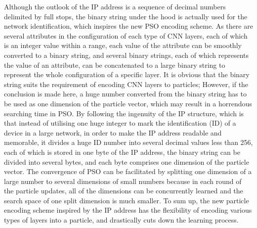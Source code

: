 \documentclass[conference]{IEEEtran}
\begin{document}
Although the outlook of the IP address is a sequence of decimal numbers delimited by full stops, the binary string under the hood is actually used for the network identification, which inspires the new PSO encoding scheme. As there are several attributes in the configuration of each type of CNN layers, each of which is an integer value within a range, each value of the attribute can be smoothly converted to a binary string, and several binary strings, each of which represents the value of an attribute, can be concatenated to a large binary string to represent the whole configuration of a specific layer. It is obvious that the binary string suits the requirement of encoding CNN layers to particles; However, if the conclusion is made here, a huge number converted from the binary string has to be used as one dimension of the particle vector, which may result in a horrendous searching time in PSO. By following the ingenuity of the IP structure, which is that instead of utilising one huge integer to mark the identification (ID) of a device in a large network, in order to make the IP address readable and memorable, it divides a huge ID number into several decimal values less than 256, each of which is stored in one byte of the IP address, the binary string can be divided into several bytes, and each byte comprises one dimension of the particle vector. The convergence of PSO can be facilitated by splitting one dimension of a large number to several dimensions of small numbers because in each round of the particle updates, all of the dimensions can be concurrently learned and the search space of one split dimension is much smaller. To sum up, the new particle encoding scheme inspired by the IP address has the flexibility of encoding various types of layers into a particle, and drastically cuts down the learning process. 


%
\end{document}
